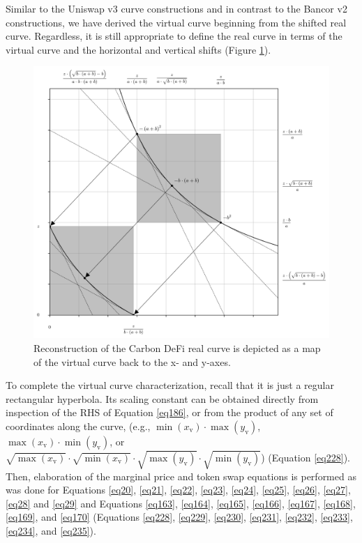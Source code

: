 \documentclass{article}
\begin{document}
Similar to the Uniswap v3 curve constructions and in contrast to the Bancor v2 constructions, we have derived the virtual curve beginning from the shifted real curve. Regardless, it is still appropriate to define the real curve in terms of the virtual curve and the horizontal and vertical shifts (Figure \ref{fig43}). 

\begin{figure}[ht]
    \centering
    \includegraphics[width=\textwidth]{fig43.png}
    \captionsetup{
        justification=raggedright,
        singlelinecheck=false,
        font=small,
        labelfont=bf,
        labelsep=quad,
        format=plain
    }
    \caption{Reconstruction of the Carbon DeFi real curve is depicted as a map of the virtual curve back to the x- and y-axes.}
    \label{fig43}
\end{figure}

To complete the virtual curve characterization, recall that it is just a regular rectangular hyperbola. Its scaling constant can be obtained directly from inspection of the RHS of Equation \ref{eq186}, or from the product of any set of coordinates along the curve, (e.g., $\min(x_{\text{v}}) \cdot \max(y_{\text{v}})$, $\max(x_{\text{v}}) \cdot \min(y_{\text{v}})$, or $\sqrt{\max(x_{\text{v}})} \cdot \sqrt{\min(x_{\text{v}})} \cdot \sqrt{\max(y_{\text{v}})} \cdot \sqrt{\min(y_{\text{v}})}$) (Equation \ref{eq228}). Then, elaboration of the marginal price and token swap equations is performed as was done for Equations \ref{eq20}, \ref{eq21}, \ref{eq22}, \ref{eq23}, \ref{eq24}, \ref{eq25}, \ref{eq26}, \ref{eq27}, \ref{eq28} and \ref{eq29} and 
Equations \ref{eq163}, \ref{eq164}, \ref{eq165}, \ref{eq166}, \ref{eq167}, \ref{eq168}, \ref{eq169}, and \ref{eq170} (Equations \ref{eq228}, \ref{eq229}, \ref{eq230}, \ref{eq231}, \ref{eq232}, \ref{eq233}, \ref{eq234}, and \ref{eq235}).
\end{document}
